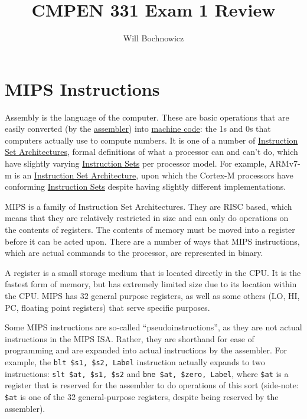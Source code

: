 \documentclass{article}
\title{CMPEN 331 Exam 1 Review}
\author{Will Bochnowicz}
\begin{document}
\maketitle

\tableofcontents

\section{MIPS Instructions}

Assembly is the language of the computer. These are basic operations that are easily converted (by the \underline{assembler}) into \underline{machine code}: the 1s and 0s that computers actually use to compute numbers. It is one of a number of \underline{Instruction Set Architectures}, formal definitions of what a processor can and can't do, which have slightly varying \underline{Instruction Sets} per processor model. For example, ARMv7-m is an \underline{Instruction Set Architecture}, upon which the Cortex-M processors have conforming \underline{Instruction Sets} despite having slightly different implementations. 

MIPS is a family of Instruction Set Architectures. They are RISC based, which means that they are relatively restricted in size and can only do operations on the contents of registers. The contents of memory must be moved into a register before it can be acted upon. There are a number of ways that MIPS instructions, which are actual commands to the processor, are represented in binary. 

A register is a small storage medium that is located directly in the CPU. It is the fastest form of memory, but has extremely limited size due to its location within the CPU. MIPS has 32 general purpose registers, as well as some others (LO, HI, PC, floating point registers) that serve specific purposes. 

Some MIPS instructions are so-called ``pseudoinstructions'', as they are not actual instructions in the MIPS ISA. Rather, they are shorthand for ease of programming and are expanded into actual instructions by the assembler. For example, the \texttt{blt \$s1, \$s2, Label} instruction actually expands to two instructions: \texttt{slt \$at, \$s1, \$s2} and \texttt{bne \$at, \$zero, Label}, where \texttt{\$at} is a register that is reserved for the assembler to do operations of this sort (side-note: \texttt{\$at} is one of the 32 general-purpose registers, despite being reserved by the assembler). 
\end{document}
